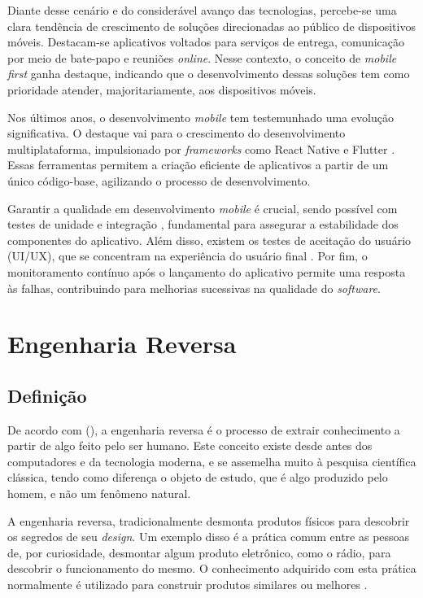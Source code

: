 Diante desse cenário e do considerável avanço das tecnologias, percebe-se uma clara tendência de crescimento de soluções direcionadas 
ao público de dispositivos móveis. Destacam-se aplicativos voltados para serviços de entrega, comunicação por meio de bate-papo e 
reuniões \textit{online}. Nesse contexto, o conceito de \textit{mobile first} ganha destaque, indicando que o desenvolvimento dessas 
soluções tem como prioridade atender, majoritariamente, aos dispositivos móveis.

Nos últimos anos, o desenvolvimento \textit{mobile} tem testemunhado uma evolução significativa. O destaque vai para o crescimento do desenvolvimento 
multiplataforma, impulsionado por \textit{frameworks} como React Native e Flutter \cite{freitas2022flutter}. Essas ferramentas permitem a criação eficiente de 
aplicativos a partir de um único código-base, agilizando o processo de desenvolvimento.

Garantir a qualidade em desenvolvimento \textit{mobile} é crucial, sendo possível com testes de unidade e integração \cite{santos2015definiccao}, fundamental para 
assegurar a estabilidade dos componentes do aplicativo. Além disso, existem os testes de aceitação do usuário (UI/UX), que se concentram na 
experiência do usuário final \cite{melo2023ux}. Por fim, o monitoramento contínuo após o lançamento do aplicativo permite uma resposta às falhas, 
contribuindo para melhorias sucessivas na qualidade do \textit{software}.

\newpage
\section{Engenharia Reversa}
\label{sectionEngReversa}

\subsection{Definição}

De acordo com  (\citeyear{eilam2011reversing}), a engenharia reversa é o 
processo de extrair conhecimento a partir de algo feito 
pelo ser humano. Este conceito existe desde antes dos computadores e da tecnologia moderna, e se 
assemelha muito à pesquisa científica clássica, tendo como diferença o objeto de estudo, que é algo 
produzido pelo homem, e não um fenômeno natural.

A engenharia reversa, tradicionalmente desmonta produtos físicos para descobrir 
os segredos de seu \textit{design}. Um exemplo disso é a prática comum entre as pessoas de, por curiosidade, 
desmontar algum produto eletrônico, como o rádio, para descobrir o funcionamento do mesmo. O conhecimento 
adquirido com esta prática normalmente é utilizado para construir produtos similares ou melhores \cite{eilam2011reversing}.

